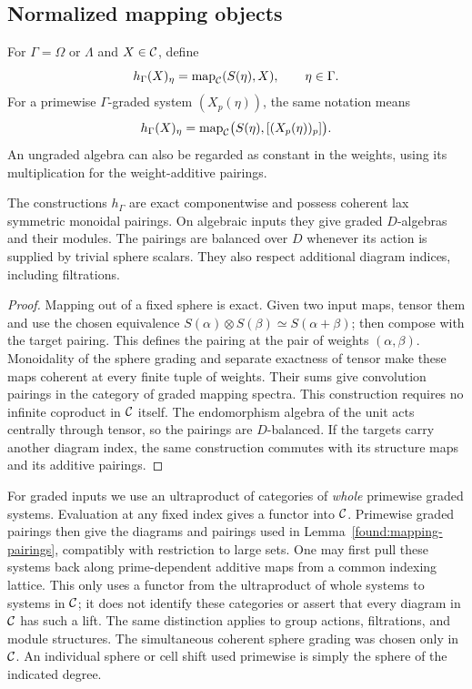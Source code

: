 \subsection{Normalized mapping objects}

For $\Gamma=\Omega$ or $\Lambda$ and $X\in\mathcal C$, define
\begin{equation}\label{eq:found-normalized-maps}
 h_\Gamma(X)_\eta=\operatorname{map}_{\mathcal C}(S(\eta),X),
 \qquad \eta\in\Gamma.
\end{equation}
For a primewise $\Gamma$-graded system $(X_p(\eta))$, the same
notation means
\[
 h_\Gamma(X)_\eta
   =\operatorname{map}_{\mathcal C}\bigl(S(\eta),[(X_p(\eta))_p]\bigr).
\]
An ungraded algebra can also be regarded as constant in the weights,
using its multiplication for the weight-additive pairings.

\begin{lemma}\label{found:mapping-pairings}
The constructions $h_\Gamma$ are exact componentwise and possess
coherent lax symmetric monoidal pairings.  On algebraic inputs they
give graded $D$-algebras and their modules.  The pairings are balanced
over $D$ whenever its action is supplied by trivial sphere scalars.
They also respect additional diagram indices, including filtrations.
\end{lemma}

\begin{proof}
Mapping out of a fixed sphere is exact.  Given two input maps, tensor
them and use the chosen equivalence
$S(\alpha)\otimes S(\beta)\simeq S(\alpha+\beta)$; then compose
with the target pairing.  This defines the pairing at the pair of
weights $(\alpha,\beta)$.  Monoidality of the sphere grading and
separate exactness of tensor make these maps coherent at every finite
tuple of weights.  Their sums give convolution pairings in the
category of graded mapping spectra.  This construction requires no
infinite coproduct in $\mathcal C$ itself.  The endomorphism algebra of the
unit acts centrally through tensor, so the pairings are $D$-balanced.
If the targets carry another diagram index, the same construction
commutes with its structure maps and its additive pairings.
\end{proof}

\begin{remark}\label{found:whole-systems}
For graded inputs we use an ultraproduct of categories of \emph{whole}
primewise graded systems.  Evaluation at any fixed index gives a
functor into $\mathcal C$.  Primewise graded pairings then give the diagrams
and pairings used in Lemma~\ref{found:mapping-pairings}, compatibly
with restriction to large sets.  One may first pull these systems
back along prime-dependent additive maps from a common indexing
lattice.  This only uses a functor from the ultraproduct of whole
systems to systems in $\mathcal C$; it does not identify these categories
or assert that every diagram in $\mathcal C$ has such a lift.  The same
distinction applies to group actions, filtrations, and module
structures.  The simultaneous coherent sphere grading was chosen
only in $\mathcal C$.  An individual sphere or cell shift used primewise is
simply the sphere of the indicated degree.
\end{remark}

